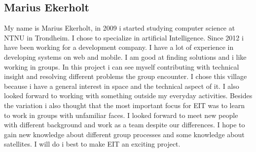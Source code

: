 \subsection{Marius Ekerholt}

My name is Marius Ekerholt, in 2009 i started studying computer science at NTNU in Trondheim. I chose to  specialize in artificial Intelligence. Since 2012 i have been working for a development company. I have a lot of experience in developing systems on web and mobile. I am good at finding solutions and i like working in groups. In this project i can see myself contributing with technical insight and resolving different problems the group encounter. 
I chose this village because i have a general interest in space and the technical aspect of it. I also looked forward to working with something outside my everyday activities. Besides the variation i also thought that the most important focus for EIT was to learn to work in groups with unfamiliar faces. I looked forward to meet new people with different background and work as a team despite our differences. I hope to gain new knowledge about different group processes and some knowledge about satellites. I will do i best to make EIT an exciting project. 
 